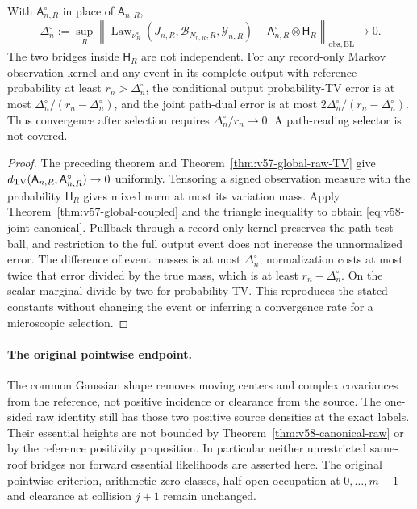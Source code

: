 \begin{corollary}
\label{cor:v58-canonical-bridge}
With $\mathsf A^\circ_{n,R}$ in place of $\mathsf A_{n,R}$,
\begin{equation}\label{eq:v58-joint-canonical}
 \Delta_n^\circ:=\sup_R
 \left\|\operatorname{Law}_{\nu_R^*}
 (J_{n,R},\mathcal B_{N_{n,R},R},\mathcal Y_{n,R})
           -\mathsf A^\circ_{n,R}\otimes\mathsf H_R
                  \right\|_{\mathrm{obs},\mathrm{BL}}\to0.
\end{equation}
The two bridges inside $\mathsf H_R$ are not independent. For any
record-only Markov observation kernel and any event in its complete
output with reference probability at least $r_n>\Delta_n^\circ$,
the conditional output probability-TV error is at most
$\Delta_n^\circ/(r_n-\Delta_n^\circ)$, and the joint path-dual error
is at most $2\Delta_n^\circ/(r_n-\Delta_n^\circ)$.
Thus convergence after selection requires
$\Delta_n^\circ/r_n\to0$. A path-reading selector is not covered.
\end{corollary}
\begin{proof}
The preceding theorem and Theorem~\ref{thm:v57-global-raw-TV} give
$d_{\rm TV}(\mathsf A_{n,R},\mathsf A^\circ_{n,R})\to0$ uniformly.
Tensoring a signed observation measure with the probability
$\mathsf H_R$ gives mixed norm at most its variation mass. Apply
Theorem~\ref{thm:v57-global-coupled} and the triangle inequality to
obtain \eqref{eq:v58-joint-canonical}. Pullback through a record-only
kernel preserves the path test ball, and restriction to the full
output event does not increase the unnormalized error. The difference
of event masses is at most $\Delta_n^\circ$; normalization costs at
most twice that error divided by the true mass, which is at least
$r_n-\Delta_n^\circ$. On the scalar marginal divide by two for
probability TV. This reproduces the stated constants without changing
the event or inferring a convergence rate for a microscopic selection.
\end{proof}

\paragraph{The original pointwise endpoint.}
The common Gaussian shape removes moving centers and complex
covariances from the reference, not positive incidence or clearance
from the source. The one-sided raw identity still has those two
positive source densities at the exact labels. Their essential heights
are not bounded by Theorem~\ref{thm:v58-canonical-raw} or by the
reference positivity proposition. In particular neither unrestricted
same-roof bridges nor forward essential likelihoods are asserted here.
The original pointwise criterion, arithmetic zero classes, half-open
occupation at $0,\ldots,m-1$ and clearance at collision $j+1$ remain
unchanged.
